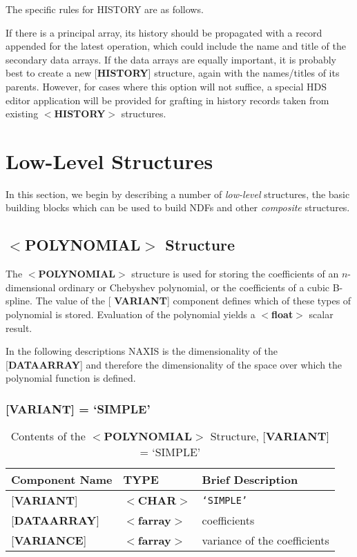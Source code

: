 \documentclass[twoside,11pt]{article}
\newcommand{\xlabel}[1]{}
\renewcommand{\_}{\texttt{\symbol{95}}}
\begin{document}
The specific rules for HISTORY are as follows.

If there is a principal array, its history should be propagated with
a record appended for the latest operation, which could include the
name and title of the secondary data arrays.  If the data arrays are
equally important, it is probably best
to create a new {[}{\bf HISTORY}{]} structure,
again with the names/titles of its parents.  However, for cases
where this option will not suffice, a special
HDS editor application will be provided for grafting
in history records taken from
existing $<${\bf HISTORY}$>$ structures.

\section{\xlabel{se_basic}Low-Level Structures\label{se:basic}}

In this section, we begin by describing a number of
{\it low-level} structures, the basic building blocks which
can be used to build NDFs and other {\it composite} structures.

\subsection{\xlabel{se_polynomial}$<${\bf POLYNOMIAL}$>$ Structure\label{se:spolynomial}}

The $<${\bf POLYNOMIAL}$>$ structure is used for storing the
coefficients of an $n$-dimensional ordinary or Chebyshev polynomial,
or the coefficients of a cubic B-spline.  The value of the {[}{\bf
VARIANT}{]} component defines which of these types of polynomial is
stored.  Evaluation of the polynomial yields a $<${\bf float}$>$
scalar result.

In the following descriptions NAXIS is the dimensionality of the
{[}{\bf DATA\_ARRAY}{]} and therefore the dimensionality of the space
over which the polynomial function is defined.

\subsubsection{{[}{\bf VARIANT}{]} = `SIMPLE'}

\begin{table}[hbt]
\centering
\caption{Contents of the $<${\bf POLYNOMIAL}$>$ Structure,
               {[}{\bf VARIANT}{]} = `SIMPLE'}
\begin{tabular}{|l|l|l|}
\hline
Component Name & TYPE & Brief Description \\ \hline
{[}{\bf VARIANT}{]} & $<${\bf \_CHAR}$>$ & {\tt `SIMPLE'} \\
{[}{\bf DATA\_ARRAY}{]} & $<${\bf farray}$>$ & coefficients \\
{[}{\bf VARIANCE}{]}  & $<${\bf farray}$>$ & variance of the
coefficients \\ \hline
\end{tabular}
\end{table}
\end{document}
